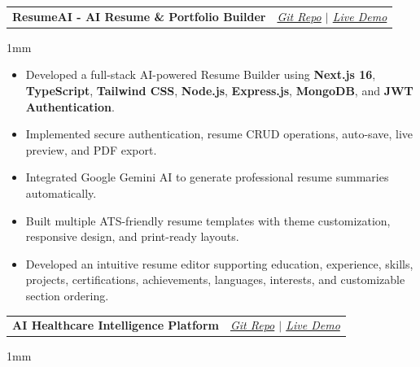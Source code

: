 \documentclass[a4paper,11pt]{article}
\makeatletter
\newcommand{\resumeProject}[3]{%
    \item
    \begin{tabular*}{0.98\textwidth}[t]{l@{\extracolsep{\fill}}r}
        \textbf{#1} & \textit{\footnotesize{#2}} \\
    \end{tabular*}
    \vspace{-5mm}
}
\newcommand{\resumeItemListStart}{\begin{justify}\begin{itemize}[leftmargin=3ex, rightmargin=2ex, noitemsep,labelsep=1.2mm,itemsep=0mm]\small}
\newcommand{\resumeItemListEnd}{\end{itemize}\end{justify}\vspace{-2mm}}
\makeatother
\begin{document}
    \resumeProject
  {ResumeAI - AI Resume \& Portfolio Builder}
  {\href{https://github.com/sainiansh3004/ResumeAI}{\color{blue}Git Repo} $|$ \href{https://resume-ai-alpha-beige.vercel.app}{\color{blue}Live Demo}}

\vspace{1mm}

\resumeItemListStart
        \item{Developed a full-stack AI-powered Resume Builder using \textbf{Next.js 16}, \textbf{TypeScript}, \textbf{Tailwind CSS}, \textbf{Node.js}, \textbf{Express.js}, \textbf{MongoDB}, and \textbf{JWT Authentication}.}
        \item{Implemented secure authentication, resume CRUD operations, auto-save, live preview, and PDF export.}
        \item{Integrated Google Gemini AI to generate professional resume summaries automatically.}
        \item{Built multiple ATS-friendly resume templates with theme customization, responsive design, and print-ready layouts.}
        \item{Developed an intuitive resume editor supporting education, experience, skills, projects, certifications, achievements, languages, interests, and customizable section ordering.}
    \resumeItemListEnd

    \vspace{-1mm}

    \resumeProject
  {AI Healthcare Intelligence Platform}
  {\href{https://github.com/sainiansh3004/ai-healthcare-intelligence-platform}{\color{blue}Git Repo} $|$ \href{https://ai-healthcare-intelligence-platform.vercel.app}{\color{blue}Live Demo}}

\vspace{1mm}
\end{document}
